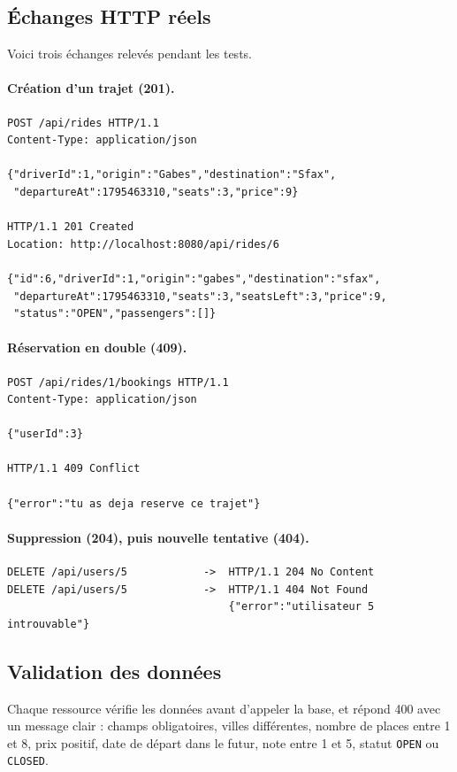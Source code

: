 \documentclass[11pt,a4paper]{article}
\begin{document}
\subsection{\'Echanges HTTP r\'eels}
Voici trois \'echanges relev\'es pendant les tests.

\paragraph{Cr\'eation d'un trajet (201).}
\begin{lstlisting}
POST /api/rides HTTP/1.1
Content-Type: application/json

{"driverId":1,"origin":"Gabes","destination":"Sfax",
 "departureAt":1795463310,"seats":3,"price":9}

HTTP/1.1 201 Created
Location: http://localhost:8080/api/rides/6

{"id":6,"driverId":1,"origin":"gabes","destination":"sfax",
 "departureAt":1795463310,"seats":3,"seatsLeft":3,"price":9,
 "status":"OPEN","passengers":[]}
\end{lstlisting}

\paragraph{R\'eservation en double (409).}
\begin{lstlisting}
POST /api/rides/1/bookings HTTP/1.1
Content-Type: application/json

{"userId":3}

HTTP/1.1 409 Conflict

{"error":"tu as deja reserve ce trajet"}
\end{lstlisting}

\paragraph{Suppression (204), puis nouvelle tentative (404).}
\begin{lstlisting}
DELETE /api/users/5            ->  HTTP/1.1 204 No Content
DELETE /api/users/5            ->  HTTP/1.1 404 Not Found
                                   {"error":"utilisateur 5 introuvable"}
\end{lstlisting}

\subsection{Validation des donn\'ees}
Chaque ressource v\'erifie les donn\'ees avant d'appeler la base, et r\'epond 400 avec un message clair : champs obligatoires, villes diff\'erentes, nombre de places entre 1 et 8, prix positif, date de d\'epart dans le futur, note entre 1 et 5, statut \texttt{OPEN} ou \texttt{CLOSED}.
\end{document}
